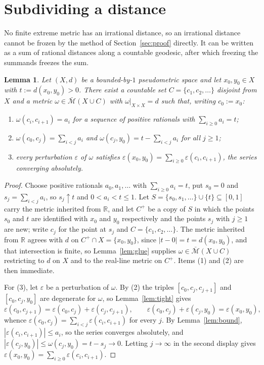 \documentclass[11pt]{article}
\newtheorem{lemma}[theorem]{Lemma}
\theoremstyle{definition}
\theoremstyle{remark}
\newcommand{\R}{\mathbb{R}}
\newcommand{\bM}{\bar{\mathcal{M}}}
\newcommand{\eps}{\varepsilon}
\begin{document}
\section{Subdividing a distance}
\label{sec:subdivide}

No finite extreme metric has an irrational distance, so an irrational distance cannot be
frozen by the method of Section~\ref{sec:proof} directly. It can be written as a sum of
rational distances along a countable geodesic, after which freezing the summands freezes
the sum.

\begin{lemma}\label{lem:subdivide}
Let $(X,d)$ be a bounded-by-$1$ pseudometric space and let $x_0,y_0\in X$ with
$t:=d(x_0,y_0)>0$. There exist a countable set $C=\{c_1,c_2,\ldots\}$ disjoint from $X$ and
a metric $\omega\in\bM(X\cup C)$ with $\omega|_{X\times X}=d$ such that, writing $c_0:=x_0$:
\begin{enumerate}
\item $\omega(c_i,c_{i+1})=a_i$ for a sequence of positive rationals with
      $\sum_{i\ge0}a_i=t$;
\item $\omega(c_0,c_j)=\sum_{i<j}a_i$ and $\omega(c_j,y_0)=t-\sum_{i<j}a_i$ for all
      $j\ge1$;
\item every perturbation $\eps$ of $\omega$ satisfies
      $\displaystyle\eps(x_0,y_0)=\sum_{i\ge0}\eps(c_i,c_{i+1})$, the series converging
      absolutely.
\end{enumerate}
\end{lemma}

\begin{proof}
Choose positive rationals $a_0,a_1,\ldots$ with $\sum_{i\ge0}a_i=t$, put $s_0=0$ and
$s_j=\sum_{i<j}a_i$, so $s_j\uparrow t$ and $0<a_i<t\le1$. Let
$S=\{s_0,s_1,\ldots\}\cup\{t\}\subseteq[0,1]$ carry the metric inherited from $\R$, and let
$C^{+}$ be a copy of $S$ in which the points $s_0$ and $t$ are identified with $x_0$ and
$y_0$ respectively and the points $s_j$ with $j\ge1$ are new; write $c_j$ for the point at
$s_j$ and $C=\{c_1,c_2,\ldots\}$. The metric inherited from $\R$ agrees with $d$ on
$C^{+}\cap X=\{x_0,y_0\}$, since $|t-0|=t=d(x_0,y_0)$, and that intersection is finite, so
Lemma~\ref{lem:glue} supplies $\omega\in\bM(X\cup C)$ restricting to $d$ on $X$ and to the
real-line metric on $C^{+}$. Items (1) and (2) are then immediate.

For (3), let $\eps$ be a perturbation of $\omega$. By (2) the triples $[c_0,c_j,c_{j+1}]$
and $[c_0,c_j,y_0]$ are degenerate for $\omega$, so Lemma~\ref{lem:tight} gives
\[
\eps(c_0,c_{j+1})=\eps(c_0,c_j)+\eps(c_j,c_{j+1}),
\qquad
\eps(c_0,c_j)+\eps(c_j,y_0)=\eps(x_0,y_0),
\]
whence $\eps(c_0,c_j)=\sum_{i<j}\eps(c_i,c_{i+1})$ for every $j$. By
Lemma~\ref{lem:bound}, $|\eps(c_i,c_{i+1})|\le a_i$, so the series converges absolutely,
and $|\eps(c_j,y_0)|\le\omega(c_j,y_0)=t-s_j\to0$. Letting $j\to\infty$ in the second
display gives $\eps(x_0,y_0)=\sum_{i\ge0}\eps(c_i,c_{i+1})$.
\end{proof}
\end{document}
